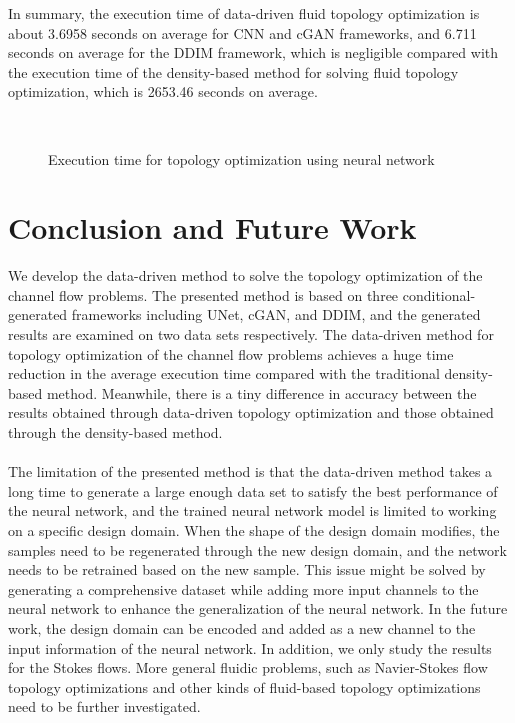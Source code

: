 \documentclass{article}
\begin{document}
In summary, the execution time of data-driven fluid topology optimization is about 3.6958 seconds on average for CNN and cGAN frameworks, and 6.711 seconds on average for the DDIM framework, which is negligible compared with the execution time of the density-based method for solving fluid topology optimization, which is 2653.46 seconds on average. 
\begin{figure}
\hfill
{}\hfill
{}\\
\captionsetup{width=1.0\linewidth}
\caption{Execution time for topology optimization using neural network}
\label{fig:TimeNN}
\end{figure}

\section{Conclusion and Future Work}
We develop the data-driven method to solve the topology optimization of the channel flow problems. The presented method is based on three conditional-generated frameworks including UNet, cGAN, and DDIM, and the generated results are examined on two data sets respectively. The data-driven method for topology optimization of the channel flow problems achieves a huge time reduction in the average execution time compared with the traditional density-based method. Meanwhile, there is a tiny difference in accuracy between the results obtained through data-driven topology optimization and those obtained through the density-based method.\\
~\\
The limitation of the presented method is that the data-driven method takes a long time to generate a large enough data set to satisfy the best performance of the neural network, and the trained neural network model is limited to working on a specific design domain. When the shape of the design domain modifies, the samples need to be regenerated through the new design domain, and the network needs to be retrained based on the new sample. This issue might be solved by generating a comprehensive dataset while adding more input channels to the neural network to enhance the generalization of the neural network. In the future work, the design domain can be encoded and added as a new channel to the input information of the neural network. In addition, we only study the results for the Stokes flows. More general fluidic problems, such as Navier-Stokes flow topology optimizations and other kinds of fluid-based topology optimizations need to be further investigated.
\end{document}
